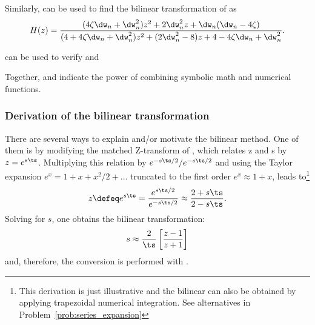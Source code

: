 Similarly,  can be used to find the bilinear transformation of 
 as
\begin{equation}
H(z) = \frac{ (4 \zeta \dw_n+\dw_n^2)z^2 + 2\dw_n^2 z + \dw_n(\dw_n -4 \zeta)} { (4+4 \zeta \dw_n + \dw_n^2)z^2 + (2 \dw_n^2-8)z + 4 - 4 \zeta \dw_n + \dw_n^2}.
\label{eq:sosBilinear4}
\end{equation}

 can be used to verify  and 


Together,  and
 indicate the power of combining symbolic math
and numerical functions.
\eExample 

\subsubsection{Derivation of the bilinear transformation}

There are several ways to explain and/or motivate the bilinear method. One of them is by modifying the matched Z-transform of , which relates z and s by $z = e^{s\ts}$. Multiplying this relation by $e^{-s\ts/2} / e^{-s\ts/2}$ and using the Taylor expansion $e^x = 1 + x + x^2/2 + \ldots$ truncated to the first order $e^x \approx 1 + x$, leads to\footnote{This derivation is just illustrative and the bilinear can also be obtained by applying trapezoidal numerical integration. See alternatives in Problem~\ref{prob:series_expansion}}
\begin{equation}
z \defeq e^{s\ts} = \frac{e^{s\ts/2}}{e^{-s\ts/2}} \approx \frac{2 + s \ts}{2 - s \ts}.
\label{eq:bilinear_small_fs}
\end{equation}
Solving for $s$, one obtains
the bilinear transformation: %
\begin{equation}
s \approx \frac{2}{\ts} \left[ \frac{z-1}{z+1} \right]
\label{eq:bilinear}
\end{equation}
and, therefore, the conversion is performed with .

